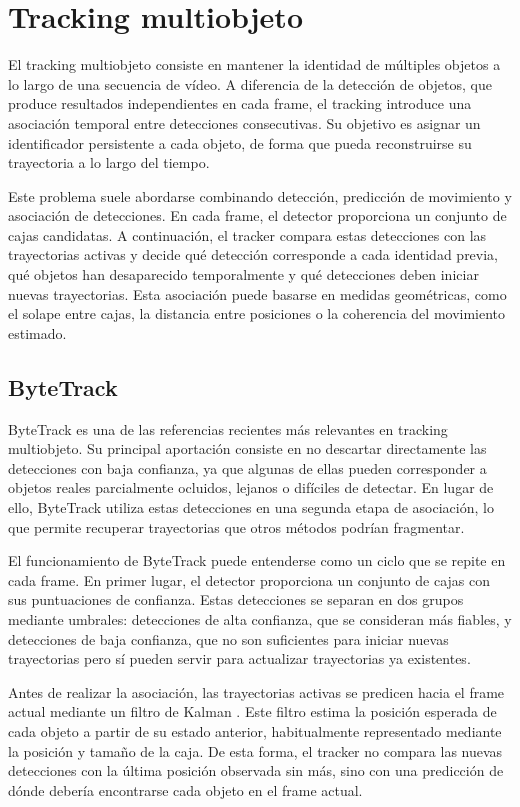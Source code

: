 \section{Tracking multiobjeto}
\label{sec:tracking-tecnologias}

El tracking multiobjeto consiste en mantener la identidad de múltiples objetos a lo largo de una secuencia de vídeo. A diferencia de la detección de objetos, que produce resultados independientes en cada frame, el tracking introduce una asociación temporal entre detecciones consecutivas. Su objetivo es asignar un identificador persistente a cada objeto, de forma que pueda reconstruirse su trayectoria a lo largo del tiempo.

Este problema suele abordarse combinando detección, predicción de movimiento y asociación de detecciones. En cada frame, el detector proporciona un conjunto de cajas candidatas. A continuación, el tracker compara estas detecciones con las trayectorias activas y decide qué detección corresponde a cada identidad previa, qué objetos han desaparecido temporalmente y qué detecciones deben iniciar nuevas trayectorias. Esta asociación puede basarse en medidas geométricas, como el solape entre cajas, la distancia entre posiciones o la coherencia del movimiento estimado.

\subsection{ByteTrack}
ByteTrack \citep{ZhangByteTrack2022} es una de las referencias recientes más relevantes en tracking multiobjeto. Su principal aportación consiste en no descartar directamente las detecciones con baja confianza, ya que algunas de ellas pueden corresponder a objetos reales parcialmente ocluidos, lejanos o difíciles de detectar. En lugar de ello, ByteTrack utiliza estas detecciones en una segunda etapa de asociación, lo que permite recuperar trayectorias que otros métodos podrían fragmentar.

El funcionamiento de ByteTrack puede entenderse como un ciclo que se repite en cada frame. En primer lugar, el detector proporciona un conjunto de cajas con sus puntuaciones de confianza. Estas detecciones se separan en dos grupos mediante umbrales: detecciones de alta confianza, que se consideran más fiables, y detecciones de baja confianza, que no son suficientes para iniciar nuevas trayectorias pero sí pueden servir para actualizar trayectorias ya existentes.

Antes de realizar la asociación, las trayectorias activas se predicen hacia el frame actual mediante un filtro de Kalman \citep{Kalman1960}. Este filtro estima la posición esperada de cada objeto a partir de su estado anterior, habitualmente representado mediante la posición y tamaño de la caja. De esta forma, el tracker no compara las nuevas detecciones con la última posición observada sin más, sino con una predicción de dónde debería encontrarse cada objeto en el frame actual.

